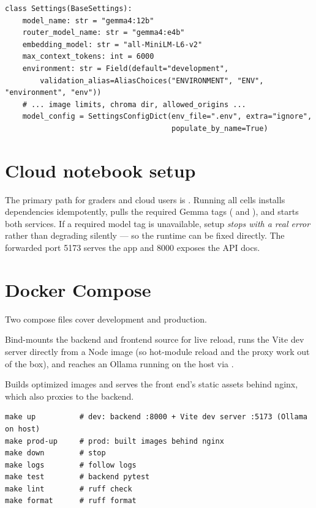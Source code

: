 \begin{lstlisting}[style=py,caption={Settings with multi-alias support (\code{app/config.py}).}]
class Settings(BaseSettings):
    model_name: str = "gemma4:12b"
    router_model_name: str = "gemma4:e4b"
    embedding_model: str = "all-MiniLM-L6-v2"
    max_context_tokens: int = 6000
    environment: str = Field(default="development",
        validation_alias=AliasChoices("ENVIRONMENT", "ENV", "environment", "env"))
    # ... image limits, chroma dir, allowed_origins ...
    model_config = SettingsConfigDict(env_file=".env", extra="ignore",
                                      populate_by_name=True)
\end{lstlisting}

\section{Cloud notebook setup}
The primary path for graders and cloud users is . Running all
cells installs dependencies idempotently, pulls the required Gemma tags
( and ), and starts both services. If a
required model tag is unavailable, setup \emph{stops with a real error} rather
than degrading silently --- so the runtime can be fixed directly. The forwarded
port 5173 serves the app and 8000 exposes the API docs.

\section{Docker Compose}
Two compose files cover development and production.

\begin{description}[style=nextline,leftmargin=0pt]
  \item[\textcolor{uaIndigoD}{Development (\code{docker-compose.yml})}]
    Bind-mounts the backend and frontend source for live reload, runs the Vite
    dev server directly from a Node image (so hot-module reload and the
     proxy work out of the box), and reaches an Ollama running on the
    host via .
  \item[\textcolor{uaIndigoD}{Production (\code{docker-compose.prod.yml})}]
    Builds optimized images and serves the front end's static assets behind
    nginx, which also proxies  to the backend.
\end{description}

\begin{lstlisting}[style=bash,caption={Developer entry points via the Makefile.}]
make up          # dev: backend :8000 + Vite dev server :5173 (Ollama on host)
make prod-up     # prod: built images behind nginx
make down        # stop
make logs        # follow logs
make test        # backend pytest
make lint        # ruff check
make format      # ruff format
\end{lstlisting}

